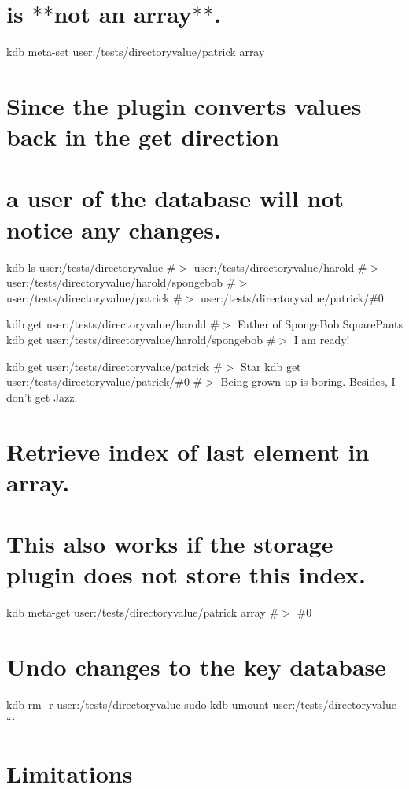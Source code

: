 \hypertarget{autotoc_md170_autotoc_md182}{}\section{is $\ast$$\ast$not an array$\ast$$\ast$.}\label{autotoc_md170_autotoc_md182}
kdb meta-\/set user\+:/tests/directoryvalue/patrick array \textquotesingle{}\textquotesingle{}\hypertarget{autotoc_md170_autotoc_md183}{}\section{Since the plugin converts values back in the get direction}\label{autotoc_md170_autotoc_md183}
\hypertarget{autotoc_md170_autotoc_md184}{}\section{a user of the database will not notice any changes.}\label{autotoc_md170_autotoc_md184}
kdb ls user\+:/tests/directoryvalue \#$>$ user\+:/tests/directoryvalue/harold \#$>$ user\+:/tests/directoryvalue/harold/spongebob \#$>$ user\+:/tests/directoryvalue/patrick \#$>$ user\+:/tests/directoryvalue/patrick/\#0

kdb get user\+:/tests/directoryvalue/harold \#$>$ Father of Sponge\+Bob Square\+Pants kdb get user\+:/tests/directoryvalue/harold/spongebob \#$>$ I am ready!

kdb get user\+:/tests/directoryvalue/patrick \#$>$ Star kdb get user\+:/tests/directoryvalue/patrick/\#0 \#$>$ Being grown-\/up is boring. Besides, I don’t get Jazz.\hypertarget{autotoc_md170_autotoc_md185}{}\section{Retrieve index of last element in array.}\label{autotoc_md170_autotoc_md185}
\hypertarget{autotoc_md170_autotoc_md186}{}\section{This also works if the storage plugin does not store this index.}\label{autotoc_md170_autotoc_md186}
kdb meta-\/get user\+:/tests/directoryvalue/patrick array \#$>$ \#0\hypertarget{autotoc_md170_autotoc_md187}{}\section{Undo changes to the key database}\label{autotoc_md170_autotoc_md187}
kdb rm -\/r user\+:/tests/directoryvalue sudo kdb umount user\+:/tests/directoryvalue ```\hypertarget{autotoc_md170_autotoc_md188}{}\section{Limitations}\label{autotoc_md170_autotoc_md188}

